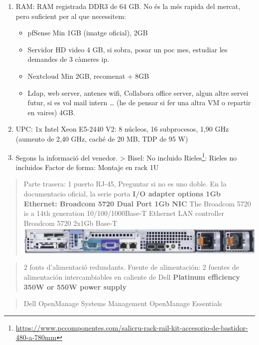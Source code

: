 \documentclass[
  10pt,
]{krantz}
\DeclareRobustCommand{\href}[2]{#2\footnote{\url{#1}}}
\providecommand{\tightlist}{%
  \setlength{\itemsep}{0pt}\setlength{\parskip}{0pt}}
\begin{document}
\begin{enumerate}
  \texttt{Tindríem\ dos\ discs\ de\ 4\,TB,\ que\ serien\ 8Gb\ d\textquotesingle{}espai\ efectiu\ i\ un\ de\ paritat.}
\item
  RAM: RAM registrada DDR3 de 64 GB. No és la més rapida del mercat, pero suficient per al que necessitem:

  \begin{itemize}
  \tightlist
  \item
    pfSense Min 1GB (imatge oficial), 2GB
  \item
    Servidor HD video 4 GB, si sobra, posar un poc mes, estudiar les demandes de 3 càmeres ip.
  \item
    Nextcloud Min 2GB, recomenat + 8GB
  \item
    Ldap, web server, antenes wifi, Collabora office server, algun altre servei futur, si es vol mail intern \ldots{} (he de pensar si fer una altra VM o repartir en vaires) 4GB.
  \end{itemize}
\item
  UPC: 1x Intel Xeon E5-2440 V2: 8 núcleos, 16 subprocesos, 1,90 GHz (aumento de 2,40 GHz, caché de 20 MB, TDP de 95 W)
\item
  Segons la informació del venedor. \textgreater{} Bisel: No incluido \href{https://www.pccomponentes.com/salicru-rack-rail-kit-accesorio-de-bastidor-480-a-780mm}{Rieles}: Rieles no incluidos Factor de forma: Montaje en rack 1U
\end{enumerate}

\begin{quote}
Parte trasera: 1 puerto RJ-45, Preguntar si no es uno doble. En la documentacio oficial, la serie porta \textbf{I/O adapter options 1Gb Ethernet: Broadcom 5720 Dual Port 1Gb NIC} The Broadcom 5720 is a 14th generation 10/100/1000Base-T Ethernet LAN controller Broadcom 5720 2x1Gb Base-T \includegraphics{imatges/ser_back.png}
\end{quote}

\begin{quote}
2 fonts d'alimentació redundants. Fuente de alimentación: 2 fuentes de alimentación intercambiables en caliente de Dell \textbf{Platinum efficiency 350W or 550W power supply}
\end{quote}

\begin{quote}
Dell OpenManage Systems Management OpenManage Essentials
\end{quote}
\end{document}
